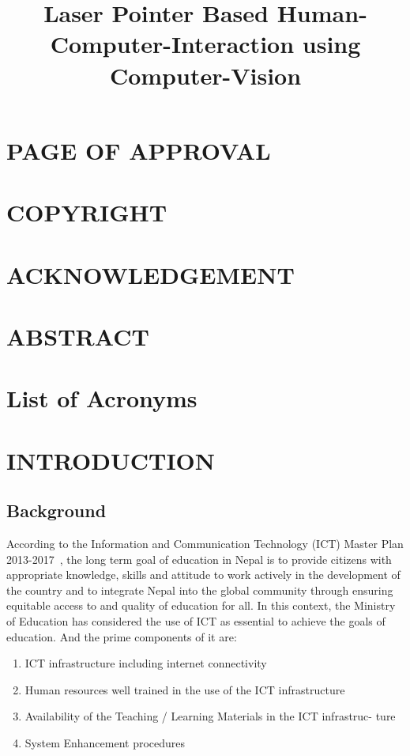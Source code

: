 \documentclass[12pt, a4paper]{article}
\title{\textbf{Laser Pointer Based Human-Computer-Interaction using Computer-Vision}}
\begin{document}
	
	
	\setcounter{page}{2}
	\section*{PAGE OF APPROVAL}
		
	\newpage
	\section*{COPYRIGHT}
		
	\newpage
	
	\section*{ACKNOWLEDGEMENT}
		
	
	\newpage
	\section*{ABSTRACT}
	
	
	
	\newpage
	\tableofcontents 
	\newpage
	\listoffigures
	\newpage
	\listoftables
	\newpage
	\section*{List of Acronyms}
		
	\clearpage
	\linespread{1.5}
\newpage
\section{INTRODUCTION}
\subsection{Background}
According to the Information and Communication Technology (ICT) Master Plan 2013-2017~\cite{kir}, the long term
goal of education in Nepal is to provide citizens with appropriate knowledge,
skills and attitude to work actively in the development of the country and to
integrate Nepal into the global community through ensuring equitable access
to and quality of education for all. In this context, the Ministry of Education
has considered the use of ICT as essential to achieve the goals of education. And the prime components of it are:
\begin{enumerate}
\item ICT infrastructure including internet connectivity
\item Human resources well trained in the use of the ICT infrastructure
\item Availability of the Teaching / Learning Materials in the ICT infrastruc-
ture
\item System Enhancement procedures
\end{enumerate}
\end{document}
